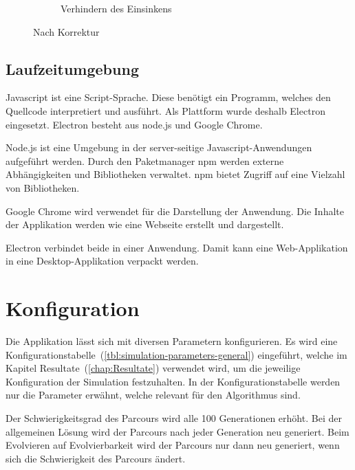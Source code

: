 \begin{figure}[H]
\begin{subfigure}[b]{0.45\textwidth}
          \caption{Verhindern des Einsinkens\label{fig:noNachEinsinken}}
        \end{subfigure}
        \caption{Nach Korrektur}
      \end{figure}

    \subsection{Laufzeitumgebung}

      Javascript ist eine Script-Sprache.
      Diese benötigt ein Programm, welches den Quellcode interpretiert und ausführt.
      Als Plattform wurde deshalb Electron eingesetzt. Electron besteht aus node.js und Google Chrome.

      \medskip

      Node.js ist eine Umgebung in der server-seitige Javascript-Anwendungen aufgeführt werden.
      Durch den Paketmanager \acrfull{npm} werden externe Abhängigkeiten und Bibliotheken verwaltet.
      \acrshort{npm} bietet Zugriff auf eine Vielzahl von Bibliotheken.

      \medskip

      Google Chrome wird verwendet für die Darstellung der Anwendung.
      Die Inhalte der Applikation werden wie eine Webseite erstellt und dargestellt.

      \medskip

      Electron verbindet beide in einer Anwendung.
      Damit kann eine Web-Applikation in eine Desktop-Applikation verpackt werden.

  \section{Konfiguration\label{sec:Konfiguration}}

    Die Applikation lässt sich mit diversen Parametern konfigurieren.
    Es wird eine Konfigurationstabelle~(\vref{tbl:simulation-parameters-general}) eingeführt,
    welche im Kapitel Resultate~(\vref{chap:Resultate}) verwendet wird,
    um die jeweilige Konfiguration der Simulation festzuhalten.
    In der Konfigurationstabelle werden nur die Parameter erwähnt,
    welche relevant für den Algorithmus sind.

    \medskip

    Der Schwierigkeitsgrad des Parcours wird alle 100 Generationen erhöht.
    Bei der allgemeinen Lösung wird der Parcours nach jeder Generation neu generiert.
    Beim Evolvieren auf Evolvierbarkeit wird der Parcours nur dann neu generiert,
    wenn sich die Schwierigkeit des Parcours ändert.

